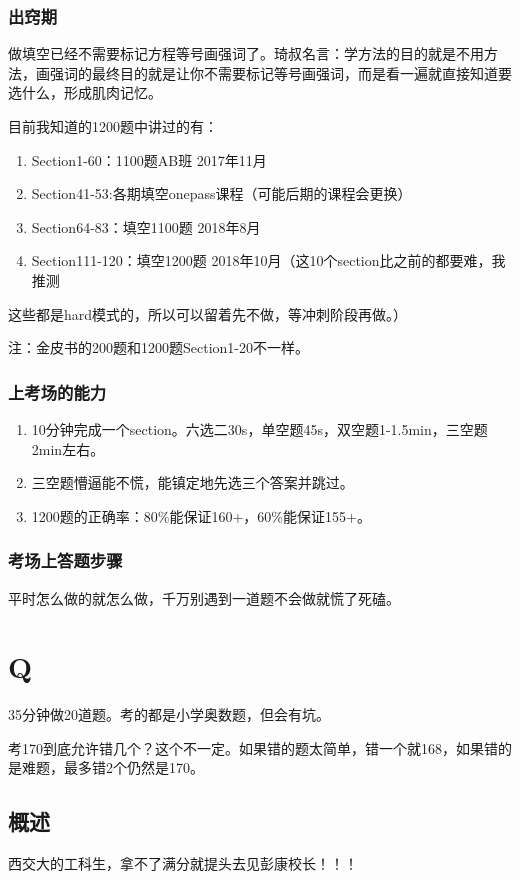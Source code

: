 \documentclass[11pt,a4paper]{article}
\begin{document}
{{{			\subsubsection*{出窍期}做填空已经不需要标记方程等号画强词了。琦叔名言：学方法的目的就是不用方法，画强词的最终目的就是让你不需要标记等号画强词，而是看一遍就直接知道要选什么，形成肌肉记忆。
			
			目前我知道的1200题中讲过的有：
			\begin{enumerate}
				\item[] Section1-60：1100题AB班	2017年11月
				\item[] Section41-53:各期填空onepass课程（可能后期的课程会更换）
				\item[] Section64-83：填空1100题	2018年8月
				\item[] Section111-120：填空1200题	2018年10月（这10个section比之前的都要难，我推测
			\end{enumerate}
			这些都是hard模式的，所以可以留着先不做，等冲刺阶段再做。）
			
			注：金皮书的200题和1200题Section1-20不一样。
			
			\subsubsection*{上考场的能力}
			\begin{enumerate}
				\item 10分钟完成一个section。六选二30s，单空题45s，双空题1-1.5min，三空题	2min左右。
				\item 三空题懵逼能不慌，能镇定地先选三个答案并跳过。
				\item 1200题的正确率：80\%能保证160+，60\%能保证155+。
			\end{enumerate}
		
			\subsubsection*{考场上答题步骤}
			平时怎么做的就怎么做，千万别遇到一道题不会做就慌了死磕。
		}
	}
	\newpage
	\section{\bfseries\LARGE{Q}}{
		35分钟做20道题。考的都是小学奥数题，但会有坑。
		
		考170到底允许错几个？这个不一定。如果错的题太简单，错一个就168，如果错的是难题，最多错2个仍然是170。
		
		\subsection*{概述}
			西交大的工科生，拿不了满分就提头去见彭康校长！！！
			
}}
\end{document}
